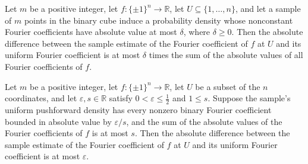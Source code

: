 \begin{theorem}
\label{FABL.abs_smallBiasFourierEstimate_sub_fourierCoeff_le}
\leanok
{}
Let $m$ be a positive integer, let $f:\{\pm1\}^n\to\mathbb R$, let
$U\subseteq\{1,\ldots,n\}$, and let a sample of $m$ points in the binary cube induce a
probability density whose nonconstant Fourier coefficients have absolute value at most
$\delta$, where $\delta\ge0$. Then the absolute difference between the sample estimate
of the Fourier coefficient of $f$ at $U$ and its uniform Fourier coefficient is at most
$\delta$ times the sum of the absolute values of all Fourier coefficients of $f$.
\end{theorem}

\begin{theorem}
\label{FABL.abs_smallBiasFourierEstimate_sub_fourierCoeff_le_parameter}
\leanok
{}
Let $m$ be a positive integer, let $f:\{\pm1\}^n\to\mathbb R$, let $U$ be a subset of
the $n$ coordinates, and let $\varepsilon,s\in\mathbb R$ satisfy
$0<\varepsilon\le\tfrac12$ and $1\le s$. Suppose the sample's uniform pushforward
density has every nonzero binary Fourier coefficient bounded in absolute value by
$\varepsilon/s$, and the sum of the absolute values of the Fourier coefficients of $f$
is at most $s$. Then the absolute difference between the sample estimate of the Fourier
coefficient of $f$ at $U$ and its uniform Fourier coefficient is at most $\varepsilon$.
\end{theorem}
